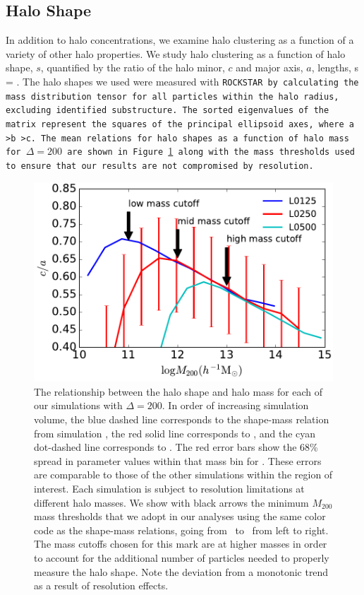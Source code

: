 \documentclass[usenatbib]{mnras}
\begin{document}
\subsection{Halo Shape}

In addition to halo concentrations, we examine halo clustering as a function of a variety of other 
halo properties. We study halo clustering as a function of halo shape, $s$, 
quantified by the ratio of the halo minor, $c$ and major axis, $a$, lengths, 
%
\beq
s = .
\eeq
%
The halo shapes we used were measured with \tt{ROCKSTAR} by calculating the mass distribution tensor for
all particles within the halo radius, excluding identified substructure. The sorted eigenvalues of the matrix represent
the squares of the principal ellipsoid axes, where a \textgreater b \textgreater c. 
The mean relations for halo shapes as a function of halo mass for $\Delta=200$ 
are shown in Figure~\ref{fig:srelation} along with the mass 
thresholds used to ensure that our results are not compromised by 
resolution.


\begin{figure}
\centering
\includegraphics[width=.5\textwidth]{masscut_shape_d200.pdf}
\caption{
The relationship between the halo shape and halo mass for each of our simulations with $\Delta =200$. 
In order of increasing simulation volume, the blue dashed line corresponds to the shape-mass relation from simulation 
\simA, the red solid line corresponds to \simB, and the cyan dot-dashed line corresponds to \simC. The red error bars show the 68\% spread in
parameter values within that mass bin for \simB. These errors are comparable to those of the other simulations
within the region of interest.
Each simulation is subject to resolution limitations at different halo masses. We show with black arrows 
the minimum $M_{200}$ mass thresholds that we adopt in our analyses using the same color code as 
the shape-mass relations, going from \simA \ to \simC \ from left to right. The mass cutoffs chosen for this mark
are at higher masses in order to account for the additional number of particles needed to properly measure the
halo shape. Note the deviation from a monotonic trend as a result of resolution effects.
}
\label{fig:srelation}
\end{figure}
\end{document}
